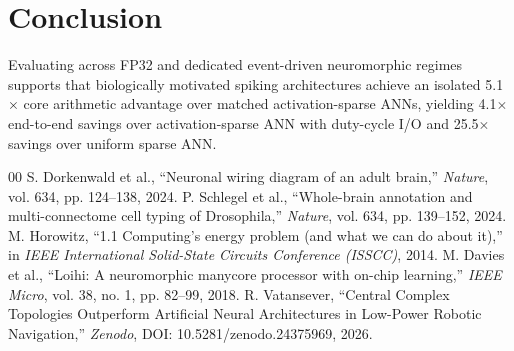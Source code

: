 \documentclass[conference]{IEEEtran}
\begin{document}
\section{Conclusion}
Evaluating across FP32 and dedicated event-driven neuromorphic regimes supports that biologically motivated spiking architectures achieve an isolated 5.1$\times$ core arithmetic advantage over matched activation-sparse ANNs, yielding 4.1$\times$ end-to-end savings over activation-sparse ANN with duty-cycle I/O and 25.5$\times$ savings over uniform sparse ANN.

\begin{thebibliography}{00}
 S. Dorkenwald et al., ``Neuronal wiring diagram of an adult brain,'' \textit{Nature}, vol. 634, pp. 124--138, 2024.
 P. Schlegel et al., ``Whole-brain annotation and multi-connectome cell typing of Drosophila,'' \textit{Nature}, vol. 634, pp. 139--152, 2024.
 M. Horowitz, ``1.1 Computing's energy problem (and what we can do about it),'' in \textit{IEEE International Solid-State Circuits Conference (ISSCC)}, 2014.
 M. Davies et al., ``Loihi: A neuromorphic manycore processor with on-chip learning,'' \textit{IEEE Micro}, vol. 38, no. 1, pp. 82--99, 2018.
 R. Vatansever, ``Central Complex Topologies Outperform Artificial Neural Architectures in Low-Power Robotic Navigation,'' \textit{Zenodo}, DOI: 10.5281/zenodo.24375969, 2026.
\end{thebibliography}
\end{document}
